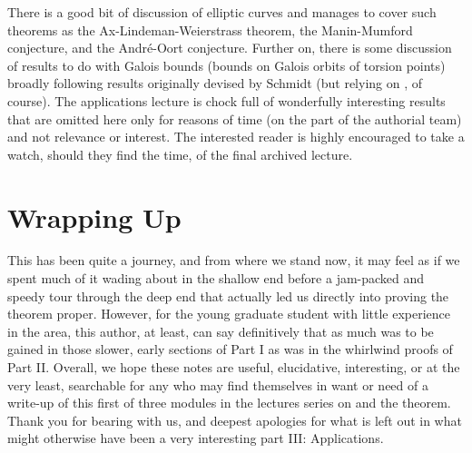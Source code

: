 There is a good bit of discussion of elliptic curves and manages to cover such theorems as the Ax-Lindeman-Weierstrass theorem, the Manin-Mumford conjecture, and the Andr\'e-Oort conjecture. Further on, there is some discussion of results to do with Galois bounds (bounds on Galois orbits of torsion points) broadly following results originally devised by Schmidt \cite{schmidt2018} (but relying on \pw, of course). The applications lecture is chock full of wonderfully interesting results that are omitted here only for reasons of time (on the part of the authorial team) and not relevance or interest. The interested reader is highly encouraged to take a watch, should they find the time, of the final archived lecture.

\section{Wrapping Up}

This has been quite a journey, and from where we stand now, it may feel as if we spent much of it wading about in the shallow end before a jam-packed and speedy tour through the deep end that actually led us directly into proving the \pw theorem proper. However, for the young graduate student with little experience in the area, this author, at least, can say definitively that as much was to be gained in those slower, early sections of Part I as was in the whirlwind proofs of Part II. Overall, we hope these notes are useful, elucidative, interesting, or at the very least, searchable for any who may find themselves in want or need of a write-up of this first of three modules in the lectures series on \omy and the \pw theorem. Thank you for bearing with us, and deepest apologies for what is left out in what might otherwise have been a very interesting part III: Applications.